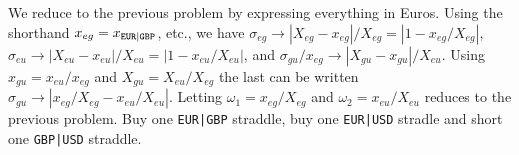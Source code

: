 \documentclass[11pt,fleqn]{amsproc}
\begin{document}
We reduce to the previous problem by expressing everything in Euros.
Using the shorthand $x_{eg} = x_{\tt EUR|GBP}$, etc.,
we have
$\sigma_{eg}\to |X_{eg} - x_{eg}|/X_{eg}
= |1 - x_{eg}/X_{eg}|$,
$\sigma_{eu}\to |X_{eu} - x_{eu}|/X_{eu}
= |1 - x_{eu}/X_{eu}|$, and
$\sigma_{gu}/x_{eg} \to |X_{gu} - x_{gu}|/X_{eu}$.
Using $x_{gu} = x_{eu}/x_{eg}$
and $X_{gu} = X_{eu}/X_{eg}$
the last can be written 
$\sigma_{gu}\to |x_{eg}/X_{eg} - x_{eu}/X_{eu}|$.
Letting $\omega_1 = x_{eg}/X_{eg}$ and $\omega_2 = x_{eu}/X_{eu}$
reduces to the previous problem. Buy one {\tt EUR|GBP} straddle,
buy one {\tt EUR|USD} stradle and short one {\tt GBP|USD} straddle.
\end{document}
